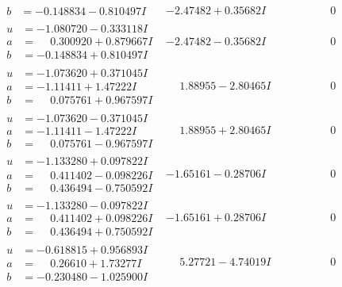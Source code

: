 \documentclass[1p]{elsarticle_modified}
\theoremstyle{definition}
\begin{document}
$$\begin{array}{c|c|c}
\begin{aligned}
b &= -0.148834 - 0.810497 I\end{aligned}
 & -2.47482 + 0.35682 I & \phantom{-0.000000 } 0 \\ \hline\begin{aligned}
u &= -1.080720 - 0.333118 I \\
a &= \phantom{-}0.300920 + 0.879667 I \\
b &= -0.148834 + 0.810497 I\end{aligned}
 & -2.47482 - 0.35682 I & \phantom{-0.000000 } 0 \\ \hline\begin{aligned}
u &= -1.073620 + 0.371045 I \\
a &= -1.11411 + 1.47222 I \\
b &= \phantom{-}0.075761 + 0.967597 I\end{aligned}
 & \phantom{-}1.88955 - 2.80465 I & \phantom{-0.000000 } 0 \\ \hline\begin{aligned}
u &= -1.073620 - 0.371045 I \\
a &= -1.11411 - 1.47222 I \\
b &= \phantom{-}0.075761 - 0.967597 I\end{aligned}
 & \phantom{-}1.88955 + 2.80465 I & \phantom{-0.000000 } 0 \\ \hline\begin{aligned}
u &= -1.133280 + 0.097822 I \\
a &= \phantom{-}0.411402 - 0.098226 I \\
b &= \phantom{-}0.436494 - 0.750592 I\end{aligned}
 & -1.65161 - 0.28706 I & \phantom{-0.000000 } 0 \\ \hline\begin{aligned}
u &= -1.133280 - 0.097822 I \\
a &= \phantom{-}0.411402 + 0.098226 I \\
b &= \phantom{-}0.436494 + 0.750592 I\end{aligned}
 & -1.65161 + 0.28706 I & \phantom{-0.000000 } 0 \\ \hline\begin{aligned}
u &= -0.618815 + 0.956893 I \\
a &= \phantom{-}0.26610 + 1.73277 I \\
b &= -0.230480 - 1.025900 I\end{aligned}
 & \phantom{-}5.27721 - 4.74019 I & \phantom{-0.000000 } 0 \\ \hline\begin{aligned}

\end{aligned}
\end{array}$$
\end{document}
